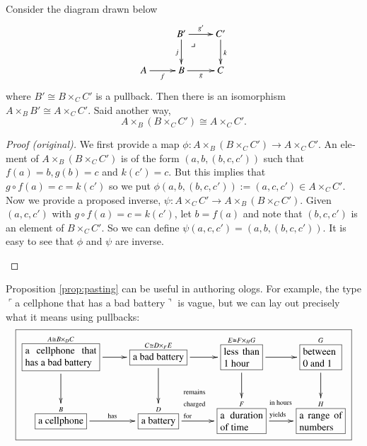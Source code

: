 \documentclass{book}
\makeatletter
\def\tn{\textnormal}
\def\to{\rightarrow}
\def\taking{\colon}
\def\iso{\cong}
\def\rr{\raggedright}
\newcommand{\LA}[2]{\ar[#1]^-{\tn {#2}}}
\newcommand{\obox}[3]{\stackrel{#1}{\fbox{\parbox{#2}{#3}}}}
\newcommand{\smbox}[2]{\stackrel{#1}{\fbox{#2}}}
\newcommand{\fakebox}[1]{\tn{$\ulcorner$#1$\urcorner$}}
\def\ullimit{\ar@{}[rd]|(.3)*+{\lrcorner}}
\theoremstyle{theoremENG}
\theoremstyle{lemmaENG}
\theoremstyle{propositionENG}
\newtheorem{propositionENG}[subsubsection]{\begin{english}Proposition\end{english}}
\theoremstyle{corollaryENG}
\theoremstyle{factENG}
\theoremstyle{remarkENG}
\theoremstyle{exampleENG}
\theoremstyle{warningENG}
\theoremstyle{questionENG}
\theoremstyle{guessENG}
\theoremstyle{answerENG}
\theoremstyle{constructionENG}
\theoremstyle{rulesENG}
\theoremstyle{excENG}
\theoremstyle{appENG}
\theoremstyle{definitionENG}
\theoremstyle{notationENG}
\theoremstyle{conjectureENG}
\theoremstyle{postulateENG}
\newenvironment{proofENG}{\begin{proof}[Proof (original)]}{\end{proof}}
\theoremstyle{theoremRUS}
\theoremstyle{lemmaRUS}
\theoremstyle{propositionRUS}
\theoremstyle{corollaryRUS}
\theoremstyle{factRUS}
\theoremstyle{remarkRUS}
\theoremstyle{exampleRUS}
\theoremstyle{warningRUS}
\theoremstyle{questionRUS}
\theoremstyle{guessRUS}
\theoremstyle{answerRUS}
\theoremstyle{constructionRUS}
\theoremstyle{rulesRUS}
\theoremstyle{excRUS}
\theoremstyle{appRUS}
\theoremstyle{definitionRUS}
\theoremstyle{notationRUS}
\theoremstyle{conjectureRUS}
\theoremstyle{postulateRUS}
\makeatother
\begin{document}
\begin{english}
\begin{russian} \end{russian}

\begin{propositionENG}\label{prop:pasting}

Consider the diagram drawn below
$$
\xymatrix{
&B'\ar[r]^{g'}\ar[d]_j\ullimit&C'\ar[d]^k\\
A\ar[r]_f&B\ar[r]_g&C}
$$
where $B'\iso B\times_CC'$ is a pullback. Then there is an isomorphism $A\times_BB'\iso A\times_CC'$. Said another way, $$A\times_B(B\times_CC')\iso A\times_CC'.$$

\begin{russian} \end{russian}

\end{propositionENG}

\begin{proofENG}

We first provide a map $\phi\taking A\times_B(B\times_CC')\to A\times_CC'$. An element of $A\times_B(B\times_CC')$ is of the form $(a,b,(b,c,c'))$ such that $f(a)=b, g(b)=c$ and $k(c')=c$. But this implies that $g\circ f(a)=c=k(c')$ so we put $\phi(a,b,(b,c,c')):=(a,c,c')\in A\times_CC'$. Now we provide a proposed inverse, $\psi\taking A\times_CC'\to A\times_B(B\times_CC')$. Given $(a,c,c')$ with $g\circ f(a)=c=k(c')$, let $b=f(a)$ and note that $(b,c,c')$ is an element of $B\times_CC'$. So we can define $\psi(a,c,c')=(a,b,(b,c,c'))$. It is easy to see that $\phi$ and $\psi$ are inverse.
 
\begin{russian} \end{russian}

\end{proofENG}

Proposition \ref{prop:pasting} can be useful in authoring ologs. For example, the type \fakebox{a cellphone that has a bad battery} is vague, but we can lay out precisely what it means using pullbacks:
\small
\begin{align}\label{dia:bad battery}
\fbox{\xymatrixnocompile{\obox{A\iso B\times_DC}{1in}{a cellphone that has a bad battery}\ar[r]\ar[d]&\smbox{C\iso D\times_FE}{a bad battery}\ar[r]\ar[d]&\obox{E\iso F\times_HG}{.5in}{less than 1 hour}\ar[r]\ar[d]&\obox{G}{.5in}{between 0 and 1}\ar[d]\\\smbox{B}{a cellphone}\LA{r}{has}&\smbox{D}{a battery}\LA{r}{\parbox{.4in}{\rr remains charged for}}&\obox{F}{.6in}{a duration of time}\LA{r}{\hspace{.07in}\parbox{.4in}{\rr in hours yields}}&\obox{H}{.6in}{a range of numbers}}}
\end{align}\normalsize


\end{english}
\end{document}
